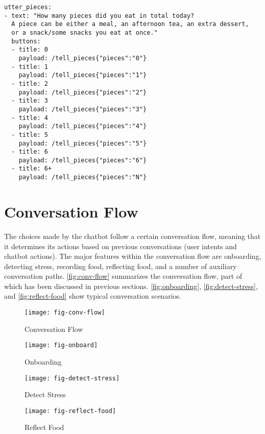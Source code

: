 \begin{lstlisting}
utter_pieces:
- text: "How many pieces did you eat in total today?
  A piece can be either a meal, an afternoon tea, an extra dessert,
  or a snack/some snacks you eat at once."
  buttons:
  - title: 0
    payload: /tell_pieces{"pieces":"0"}
  - title: 1
    payload: /tell_pieces{"pieces":"1"}
  - title: 2
    payload: /tell_pieces{"pieces":"2"}
  - title: 3
    payload: /tell_pieces{"pieces":"3"}
  - title: 4
    payload: /tell_pieces{"pieces":"4"}
  - title: 5
    payload: /tell_pieces{"pieces":"5"}
  - title: 6
    payload: /tell_pieces{"pieces":"6"}
  - title: 6+
    payload: /tell_pieces{"pieces":"N"}
\end{lstlisting}

\section{Conversation Flow} \label{flow}
The choices made by the chatbot follow a certain conversation flow, meaning that it determines its actions based on previous conversations (user intents and chatbot actions). The major features within the conversation flow are onboarding, detecting stress, recording food, reflecting food, and a number of auxiliary conversation paths. \autoref{fig:conv-flow} summarizes the conversation flow, part of which has been discussed in previous sections. \autoref{fig:onboarding}, \autoref{fig:detect-stress}, and \autoref{fig:reflect-food} show typical conversation scenarios.

\begin{figure}[ht]
  \centering
  \texttt{[image: fig-conv-flow]}
  \caption{Conversation Flow}
  \label{fig:conv-flow}
\end{figure}

\begin{figure}[ht]
  \centering
  \texttt{[image: fig-onboard]}
  \caption{Onboarding}
  \label{fig:onboarding}
\end{figure}

\begin{figure}[ht]
  \centering
  \texttt{[image: fig-detect-stress]}
  \caption{Detect Stress}
  \label{fig:detect-stress}
\end{figure}

\begin{figure}[ht]
  \centering
  \texttt{[image: fig-reflect-food]}
  \caption{Reflect Food}
  \label{fig:reflect-food}
\end{figure}

